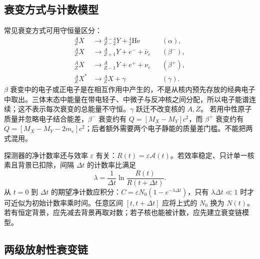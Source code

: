 \subsection{衰变方式与计数模型}
常见衰变方式可用守恒量区分：
\begin{align*}
 {}^A_ZX&\to{}^{A-4}_{Z-2}Y+{}^4_2\mathrm{He} &&(\alpha),\\
 {}^A_ZX&\to{}^A_{Z+1}Y+e^-+\bar\nu_e &&(\beta^-),\\
 {}^A_ZX&\to{}^A_{Z-1}Y+e^++\nu_e &&(\beta^+),\\
 {}^A_ZX^*&\to{}^A_ZX+\gamma &&(\gamma).
\end{align*}
$\beta$ 衰变中的电子或正电子是在相互作用中产生的，不是从核内预先存放的经典电子中取出。三体末态中能量在带电轻子、中微子与反冲核之间分配，所以电子能谱连续；这不表示每次衰变的总能量不守恒。$\gamma$ 跃迁不改变核的 $A,Z$。
若用中性原子质量并忽略电子结合能差，$\beta^-$ 衰变约有 $Q=[M_X-M_Y]c^2$，而 $\beta^+$ 衰变约有 $Q=[M_X-M_Y-2m_e]c^2$；后者额外需要两个电子静能的质量差门槛。不能把两式混用。

探测器的净计数率还与效率 $\varepsilon$ 有关：$R(t)=\varepsilon\mathcal A(t)$。若效率稳定、只计单一核素且背景已扣除，间隔 $\Delta t$ 的计数率比满足
\[
 \lambda=\frac1{\Delta t}\ln\frac{R(t)}{R(t+\Delta t)}.
\]
从 $t=0$ 到 $\Delta t$ 的期望净计数应积分：$C=\varepsilon N_0(1-e^{-\lambda\Delta t})$，只有 $\lambda\Delta t\ll1$ 时才可近似为初始计数率乘时间。任意区间 $[t,t+\Delta t]$ 应将上式的 $N_0$ 换为 $N(t)$。若有恒定背景，应先减去背景再取对数；若子核也能被计数，应先建立衰变链模型。

\subsection{两级放射性衰变链}

